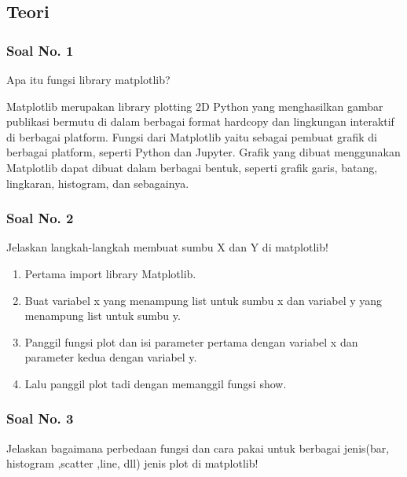 \subsection{Teori}
\subsubsection{Soal No. 1}
\hfill \break
Apa itu fungsi library matplotlib?

\hfill \break
Matplotlib merupakan library plotting 2D Python yang menghasilkan gambar publikasi bermutu di dalam berbagai format hardcopy dan lingkungan interaktif di berbagai platform.
Fungsi dari Matplotlib yaitu sebagai pembuat grafik di berbagai platform, seperti Python dan Jupyter. Grafik yang dibuat menggunakan Matplotlib dapat dibuat dalam berbagai bentuk, seperti grafik garis, batang, lingkaran, histogram, dan sebagainya.

\subsubsection{Soal No. 2}
\hfill \break
Jelaskan langkah-langkah membuat sumbu X dan Y di matplotlib!

\begin{enumerate}
	\item Pertama import library Matplotlib.	
	
	
	\item Buat variabel x yang menampung list untuk sumbu x dan variabel y yang menampung list untuk sumbu y.	
	
	
	\item Panggil fungsi plot dan isi parameter pertama dengan variabel x dan parameter kedua dengan variabel y.
		

	\item Lalu panggil plot tadi dengan memanggil fungsi show.
	
	
\end{enumerate}

 
\subsubsection{Soal No. 3}
\hfill \break
Jelaskan bagaimana perbedaan fungsi dan cara pakai untuk berbagai jenis(bar, histogram ,scatter ,line, dll) jenis plot di matplotlib!

